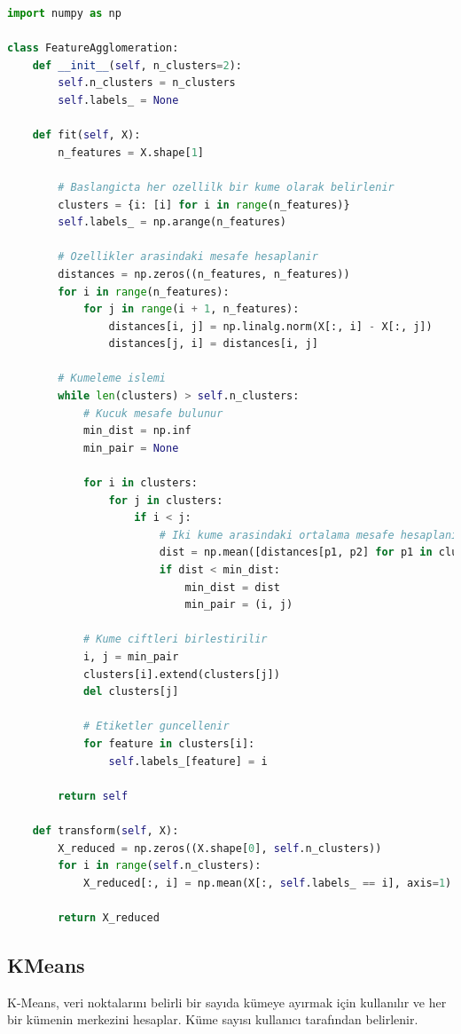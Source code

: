 \begin{lstlisting}[language=Python, caption=Scikit-learn'de FeatureAgglomeration örneği.]
import numpy as np

class FeatureAgglomeration:
    def __init__(self, n_clusters=2):
        self.n_clusters = n_clusters
        self.labels_ = None

    def fit(self, X):
        n_features = X.shape[1]

        # Baslangicta her ozellilk bir kume olarak belirlenir
        clusters = {i: [i] for i in range(n_features)}
        self.labels_ = np.arange(n_features)

        # Ozellikler arasindaki mesafe hesaplanir
        distances = np.zeros((n_features, n_features))
        for i in range(n_features):
            for j in range(i + 1, n_features):
                distances[i, j] = np.linalg.norm(X[:, i] - X[:, j])
                distances[j, i] = distances[i, j]

        # Kumeleme islemi
        while len(clusters) > self.n_clusters:
            # Kucuk mesafe bulunur
            min_dist = np.inf
            min_pair = None

            for i in clusters:
                for j in clusters:
                    if i < j:
                        # Iki kume arasindaki ortalama mesafe hesaplanir
                        dist = np.mean([distances[p1, p2] for p1 in clusters[i] for p2 in clusters[i]])
                        if dist < min_dist:
                            min_dist = dist
                            min_pair = (i, j)

            # Kume ciftleri birlestirilir
            i, j = min_pair
            clusters[i].extend(clusters[j])
            del clusters[j]

            # Etiketler guncellenir
            for feature in clusters[i]:
                self.labels_[feature] = i

        return self

    def transform(self, X):
        X_reduced = np.zeros((X.shape[0], self.n_clusters))
        for i in range(self.n_clusters):
            X_reduced[:, i] = np.mean(X[:, self.labels_ == i], axis=1)

        return X_reduced
\end{lstlisting}

\newpage

\subsection{KMeans}
K-Means, veri noktalarını belirli bir sayıda kümeye ayırmak için kullanılır ve her bir kümenin merkezini hesaplar. Küme sayısı kullanıcı tarafından belirlenir.


